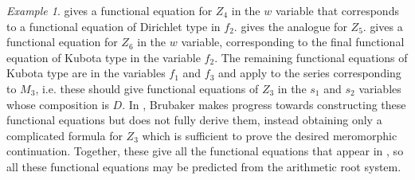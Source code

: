 \documentclass[11pt,letterpaper]{article}
\theoremstyle{definition}
\theoremstyle{remark}
\newtheorem{example}[theorem]{Example}
\numberwithin{equation}{section}
\theoremstyle{dotless}
\begin{document}
\begin{example}
\cite[Proposition 6.2]{BrubakerThesis} gives a functional equation for $Z_4$ in the $w$ variable that corresponds to a functional equation of Dirichlet type in $f_2$. \cite[\S6.3]{BrubakerThesis} gives the analogue for $Z_5$. \cite[Proposition 6.9]{BrubakerThesis} gives a functional equation for $Z_6$ in the $w$ variable, corresponding to the final functional equation of Kubota type in the variable $f_2$. The remaining functional equations of Kubota type are in the variables $f_1$ and $f_3$ and apply to the series corresponding to $M_3$, i.e. these should give functional equations of $Z_3$ in the $s_1$ and $s_2$ variables whose composition is $D$. In \cite[\S6.5.1]{BrubakerThesis}, Brubaker makes progress towards constructing these functional equations but does not fully derive them, instead obtaining only a complicated formula \cite[(6.20)]{BrubakerThesis} for $Z_3$ which is sufficient to prove the desired meromorphic continuation.  Together, these give all the functional equations that appear in \cite{BrubakerThesis}, so all these functional equations may be predicted from the arithmetic root system.  \end{example}
\end{document}
